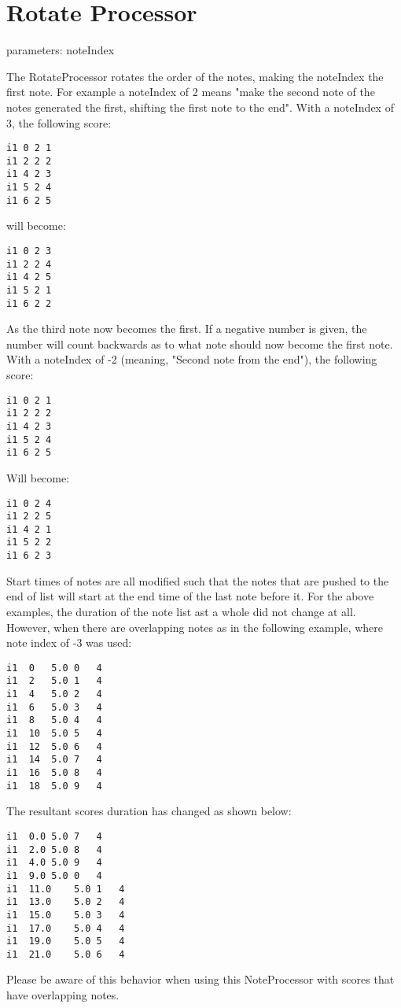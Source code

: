 \section{Rotate Processor}\label{rotateProcessor}

parameters: noteIndex

The RotateProcessor rotates the order of the notes, making the noteIndex
the first note. For example a noteIndex of 2 means "make the second note
of the notes generated the first, shifting the first note to the end".
With a noteIndex of 3, the following score:

\begin{verbatim}
i1 0 2 1
i1 2 2 2
i1 4 2 3
i1 5 2 4
i1 6 2 5
\end{verbatim}

will become:

\begin{verbatim}
i1 0 2 3
i1 2 2 4
i1 4 2 5
i1 5 2 1
i1 6 2 2
\end{verbatim}

As the third note now becomes the first. If a negative number is given,
the number will count backwards as to what note should now become the
first note. With a noteIndex of -2 (meaning, "Second note from the
end"), the following score:

\begin{verbatim}
i1 0 2 1
i1 2 2 2
i1 4 2 3
i1 5 2 4
i1 6 2 5
\end{verbatim}

Will become:

\begin{verbatim}
i1 0 2 4
i1 2 2 5
i1 4 2 1
i1 5 2 2
i1 6 2 3
\end{verbatim}

Start times of notes are all modified such that the notes that are
pushed to the end of list will start at the end time of the last note
before it. For the above examples, the duration of the note list ast a
whole did not change at all. However, when there are overlapping notes
as in the following example, where note index of -3 was used:

\begin{verbatim}
i1  0   5.0 0   4   
i1  2   5.0 1   4   
i1  4   5.0 2   4   
i1  6   5.0 3   4   
i1  8   5.0 4   4   
i1  10  5.0 5   4   
i1  12  5.0 6   4   
i1  14  5.0 7   4   
i1  16  5.0 8   4   
i1  18  5.0 9   4   
\end{verbatim}

The resultant scores duration has changed as shown below:

\begin{verbatim}
i1  0.0 5.0 7   4   
i1  2.0 5.0 8   4   
i1  4.0 5.0 9   4   
i1  9.0 5.0 0   4   
i1  11.0    5.0 1   4   
i1  13.0    5.0 2   4   
i1  15.0    5.0 3   4   
i1  17.0    5.0 4   4   
i1  19.0    5.0 5   4   
i1  21.0    5.0 6   4   
\end{verbatim}

Please be aware of this behavior when using this NoteProcessor with
scores that have overlapping notes.
